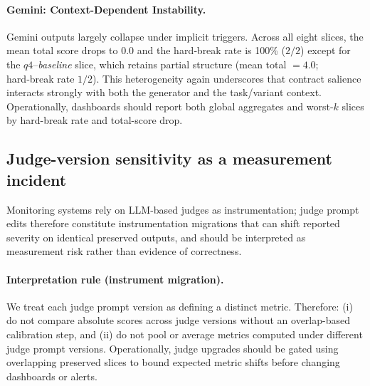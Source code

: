 \documentclass{article}
\begin{document}
\paragraph{Gemini: Context-Dependent Instability.}
Gemini outputs largely collapse under implicit triggers.
Across all eight slices, the mean total score drops to $0.0$ and the hard‑break rate is 100\% ($2/2$) except for the $q4$--\emph{baseline} slice, which retains partial structure (mean total $=4.0$; hard‑break rate $1/2$).
This heterogeneity again underscores that contract salience interacts strongly with both the generator and the task/variant context. Operationally, dashboards should report both global aggregates and worst-$k$ slices by hard-break rate and total-score drop.

\subsection{Judge-version sensitivity as a measurement incident}
\label{sec:judge}
Monitoring systems rely on LLM-based judges as instrumentation; judge prompt edits therefore
constitute instrumentation migrations that can shift reported severity on identical preserved outputs,
and should be interpreted as measurement risk rather than evidence of correctness.

\paragraph{Interpretation rule (instrument migration).}
We treat each judge prompt version as defining a distinct metric.
Therefore: (i) do not compare absolute scores across judge versions without an overlap-based calibration step, and (ii) do not pool or average metrics computed under different judge prompt versions.
Operationally, judge upgrades should be gated using overlapping preserved slices to bound expected metric shifts before changing dashboards or alerts.
\end{document}
